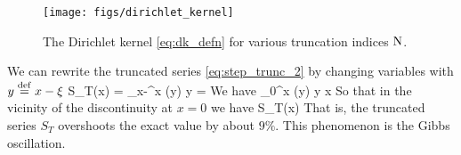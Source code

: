 \documentclass[11pt]{article}
\begin{document}
\begin{figure}[ht]
\begin{center}
    \texttt{[image: figs/dirichlet\_kernel]}
\end{center}
\caption{The Dirichlet kernel \eqref{eq:dk_defn} for various truncation indices $\mathrm{N}$.}
\label{fig:dk}
\end{figure}

We can rewrite the truncated series  \eqref{eq:step_trunc_2} by changing variables with $y\stackrel{\mathrm{def}}{=} x - \xi$
\beq
S_T(x) =  \int_{x-\pi}^x \sDN(y) \dd y =     \per
\eeq
We have
\beq
\int_0^x \sDN(y) \dd y  \pi\com\qquad {} \qquad x \qquad {}\per
\eeq
So that in the vicinity of the discontinuity at $x=0$ we have
\beq
S_T(x) \per
\eeq
That is, the truncated series $S_T$ overshoots the exact value by about $9\%$. This phenomenon is the Gibbs oscillation.
\end{document}
